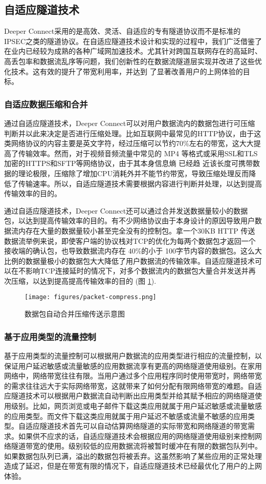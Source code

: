 \documentclass[a4paper]{article}
\begin{document}
\subsection{自适应隧道技术}
Deeper Connect采用的是高效、灵活、自适应的专有隧道协议而不是标准的IPSEC之类的隧道协议。在自适应隧道技术设计和实现的过程中，我们广泛借鉴了在业内已经较为成熟的各种广域网加速技术\cite{wan-optimization}。尤其针对跨国互联网存在的高延时、高丢包率和数据流乱序等问题，我们创新性的在数据流隧道层实现并改进了这些优化技术。这有效的提升了带宽利用率，并达到
了显著改善用户的上网体验的目标。

\subsubsection{自适应数据压缩和合并}
通过自适应隧道技术，Deeper Connect可以对用户数据流内的数据包进行可压缩判断并以此来决定是否进行压缩处理。比如互联网中最常见的HTTP协议，由于这类网络协议的内容主要是英文字符，经过压缩可以节约70\%左右的带宽，这大大提高了传输效率。然而，对于视频音频流量中常见的 MP4 等格式或采用SSL和TLS加密的HTTPS和SFTP等网络协议，由于其本身信息熵 \cite{shannon2001}已经趋
近该长度可携带数据的理论极限，压缩除了增加CPU消耗外并不能节约带宽，导致压缩处理反而降低了传输速率。所以，自适应隧道技术需要根据内容进行判断并处理，以达到提高传输效率的目的。

通过自适应隧道技术，Deeper Connect还可以通过合并发送数据量较小的数据包，以达到提高传输效率的目的。有不少网络协议由于本身设计的原因导致用户数据流内存在大量的数据量较小甚至完全没有的控制包。拿一个30KB HTTP 传送数据流举例来说，即使客户端的协议栈对TCP的优化为每两个数据包才返回一个接收端的确认包，也导致数据流内存在 40\%的小于 100字节内容的数据包。这么大比例的数据量极小的数据包大大降低了用户数据流的传输效率。自适应隧道技术可以在不影响TCP连接延时的情况下，对多个数据流内的数据包大量合并发送并再次压缩，以达到提高提高传输效率的目的 (图 \ref{fig:packet-compress}).

\begin{figure}[hhhh]
\centering
\texttt{[image: figures/packet-compress.png]}
\caption{数据包自动合并压缩传送示意图}
\label{fig:packet-compress}
\end{figure}

\subsubsection{基于应用类型的流量控制}
基于应用类型的流量控制可以根据用户数据流的应用类型进行相应的流量控制，以保证用户延迟敏感或流量敏感的应用数据流享有更高的网络隧道使用级别。在家用网络中，网络带宽往往有限。当用户通过多个应用程序同时使用带宽时，网络带宽的需求往往远大于实际网络带宽，这就带来了如何分配有限网络带宽的难题。自适应隧道技术可以根据用户数据流自动判断出应用类型并给其赋予相应的网络隧道使用级别。比如，网页浏览或电子邮件下载这类应用就属于用户延迟敏感或流量敏感的应用类型。而文件下载这类应用就属于用户延迟不敏感或流量不敏感的应用类型。自适应隧道技术首先可以自动估算网络隧道的实际带宽和网络隧道的带宽需求。如果供不应求的话，自适应隧道技术会根据应用的网络隧道使用级别来控制网络隧道带宽的使用。级别较低的应用数据流将被暂时缓冲在有限的数据包队列中。如果数据包队列已满，溢出的数据包将被丢弃。这虽然影响了某些应用的正常处理造成了延迟，但是在带宽有限的情况下，自适应隧道技术已经最优化了用户的上网体验。
\end{document}
